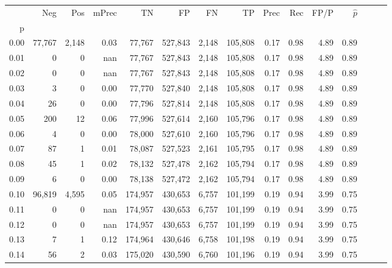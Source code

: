 \begin{tabular}{rrrrrrrrrrrrrrr}
\toprule
{} &     Neg &     Pos & mPrec &       TN &       FP &       FN &       TP &  Prec &   Rec &  FP/P & $\hat{p}$ \\
p    &         &         &       &          &          &          &          &       &       &       &           \\
\midrule
0.00 &  77,767 &   2,148 &  0.03 &   77,767 &  527,843 &    2,148 &  105,808 &  0.17 &  0.98 &  4.89 &      0.89 \\
0.01 &       0 &       0 &   nan &   77,767 &  527,843 &    2,148 &  105,808 &  0.17 &  0.98 &  4.89 &      0.89 \\
0.02 &       0 &       0 &   nan &   77,767 &  527,843 &    2,148 &  105,808 &  0.17 &  0.98 &  4.89 &      0.89 \\
0.03 &       3 &       0 &  0.00 &   77,770 &  527,840 &    2,148 &  105,808 &  0.17 &  0.98 &  4.89 &      0.89 \\
0.04 &      26 &       0 &  0.00 &   77,796 &  527,814 &    2,148 &  105,808 &  0.17 &  0.98 &  4.89 &      0.89 \\
0.05 &     200 &      12 &  0.06 &   77,996 &  527,614 &    2,160 &  105,796 &  0.17 &  0.98 &  4.89 &      0.89 \\
0.06 &       4 &       0 &  0.00 &   78,000 &  527,610 &    2,160 &  105,796 &  0.17 &  0.98 &  4.89 &      0.89 \\
0.07 &      87 &       1 &  0.01 &   78,087 &  527,523 &    2,161 &  105,795 &  0.17 &  0.98 &  4.89 &      0.89 \\
0.08 &      45 &       1 &  0.02 &   78,132 &  527,478 &    2,162 &  105,794 &  0.17 &  0.98 &  4.89 &      0.89 \\
0.09 &       6 &       0 &  0.00 &   78,138 &  527,472 &    2,162 &  105,794 &  0.17 &  0.98 &  4.89 &      0.89 \\
0.10 &  96,819 &   4,595 &  0.05 &  174,957 &  430,653 &    6,757 &  101,199 &  0.19 &  0.94 &  3.99 &      0.75 \\
0.11 &       0 &       0 &   nan &  174,957 &  430,653 &    6,757 &  101,199 &  0.19 &  0.94 &  3.99 &      0.75 \\
0.12 &       0 &       0 &   nan &  174,957 &  430,653 &    6,757 &  101,199 &  0.19 &  0.94 &  3.99 &      0.75 \\
0.13 &       7 &       1 &  0.12 &  174,964 &  430,646 &    6,758 &  101,198 &  0.19 &  0.94 &  3.99 &      0.75 \\
0.14 &      56 &       2 &  0.03 &  175,020 &  430,590 &    6,760 &  101,196 &  0.19 &  0.94 &  3.99 &      0.75 \\

\end{tabular}
